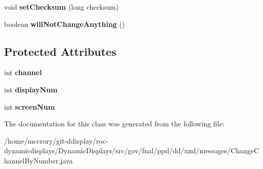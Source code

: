 \begin{DoxyCompactItemize}
\item 
\hypertarget{classgov_1_1fnal_1_1ppd_1_1dd_1_1xml_1_1messages_1_1ChangeChannelByNumber_a9e2557a6994603e976860a415d0abb7f}{void {\bfseries set\-Checksum} (long checksum)}\label{classgov_1_1fnal_1_1ppd_1_1dd_1_1xml_1_1messages_1_1ChangeChannelByNumber_a9e2557a6994603e976860a415d0abb7f}

\item 
\hypertarget{classgov_1_1fnal_1_1ppd_1_1dd_1_1xml_1_1messages_1_1ChangeChannelByNumber_a46ff1bf15e4419fcce75c63a743a5fb8}{boolean {\bfseries will\-Not\-Change\-Anything} ()}\label{classgov_1_1fnal_1_1ppd_1_1dd_1_1xml_1_1messages_1_1ChangeChannelByNumber_a46ff1bf15e4419fcce75c63a743a5fb8}

\end{DoxyCompactItemize}
\subsection*{Protected Attributes}
\begin{DoxyCompactItemize}
\item 
\hypertarget{classgov_1_1fnal_1_1ppd_1_1dd_1_1xml_1_1messages_1_1ChangeChannelByNumber_a172f59b68a3890f2033eec1b9fb53441}{int {\bfseries channel}}\label{classgov_1_1fnal_1_1ppd_1_1dd_1_1xml_1_1messages_1_1ChangeChannelByNumber_a172f59b68a3890f2033eec1b9fb53441}

\item 
\hypertarget{classgov_1_1fnal_1_1ppd_1_1dd_1_1xml_1_1messages_1_1ChangeChannelByNumber_ac7aaa8baec77d014e288b5a5eb5f5dff}{int {\bfseries display\-Num}}\label{classgov_1_1fnal_1_1ppd_1_1dd_1_1xml_1_1messages_1_1ChangeChannelByNumber_ac7aaa8baec77d014e288b5a5eb5f5dff}

\item 
\hypertarget{classgov_1_1fnal_1_1ppd_1_1dd_1_1xml_1_1messages_1_1ChangeChannelByNumber_afc6e5fa859ed5ddcd9605aa9db8929a6}{int {\bfseries screen\-Num}}\label{classgov_1_1fnal_1_1ppd_1_1dd_1_1xml_1_1messages_1_1ChangeChannelByNumber_afc6e5fa859ed5ddcd9605aa9db8929a6}

\end{DoxyCompactItemize}


The documentation for this class was generated from the following file\-:\begin{DoxyCompactItemize}
\item 
/home/mccrory/git-\/ddisplay/roc-\/dynamicdisplays/\-Dynamic\-Displays/src/gov/fnal/ppd/dd/xml/messages/Change\-Channel\-By\-Number.\-java\end{DoxyCompactItemize}
